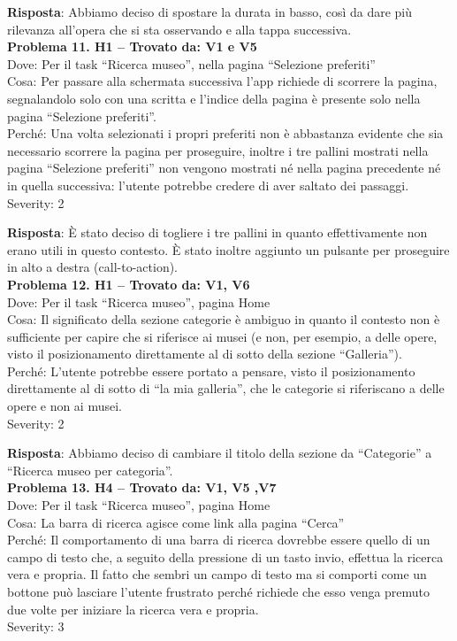 \documentclass{article}
\begin{document}
\noindent \textbf{Risposta}: Abbiamo deciso di spostare la durata in basso, così da dare più rilevanza all’opera che si sta osservando e alla tappa successiva.\\

\noindent \textbf{Problema 11. H1 – Trovato da: V1 e V5} \\
Dove: Per il task “Ricerca museo”, nella pagina “Selezione preferiti” \\
Cosa: Per passare alla schermata successiva l’app richiede di scorrere la pagina, segnalandolo solo con una scritta e l’indice della pagina è presente solo nella pagina “Selezione preferiti”. \\
Perché: Una volta selezionati i propri preferiti non è abbastanza evidente che sia necessario scorrere la pagina per proseguire, inoltre i tre pallini mostrati nella pagina “Selezione preferiti” non vengono mostrati né nella pagina precedente né in quella successiva: l’utente potrebbe credere di aver saltato dei passaggi. \\
Severity: 2

\noindent \textbf{Risposta}: È stato deciso di togliere i tre pallini in quanto effettivamente non erano utili in questo contesto. È stato inoltre aggiunto un pulsante per proseguire in alto a destra (call-to-action).\\

\noindent \textbf{Problema 12. H1 – Trovato da: V1, V6} \\
Dove: Per il task “Ricerca museo”, pagina Home \\
Cosa: Il significato della sezione categorie è ambiguo in quanto il contesto non è sufficiente per capire che si riferisce ai musei (e non, per esempio, a delle opere, visto il posizionamento direttamente al di sotto della sezione “Galleria”). \\
Perché: L’utente potrebbe essere portato a pensare, visto il posizionamento direttamente al di sotto di “la mia galleria”, che le categorie si riferiscano a delle opere e non ai musei. \\
Severity: 2

\noindent \textbf{Risposta}: Abbiamo deciso di cambiare il titolo della sezione da “Categorie” a “Ricerca museo per categoria”.\\

\noindent \textbf{Problema 13. H4 – Trovato da: V1, V5 ,V7} \\
Dove: Per il task “Ricerca museo”, pagina Home \\
Cosa: La barra di ricerca agisce come link alla pagina “Cerca” \\
Perché: Il comportamento di una barra di ricerca dovrebbe essere quello di un campo di testo che, a seguito della pressione di un tasto invio, effettua la ricerca vera e propria. Il fatto che sembri un campo di testo ma si comporti come un bottone può lasciare l’utente frustrato perché richiede che esso venga premuto due volte per iniziare la ricerca vera e propria. \\
Severity: 3
\end{document}
